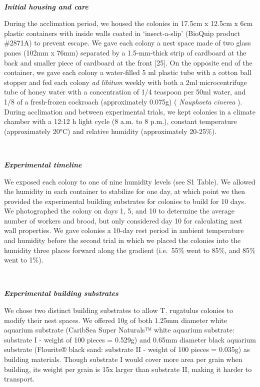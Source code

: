 \documentclass[3p]{elsarticle} %
\begin{document}
~

\textbf{\emph{Initial housing and care}}

During the acclimation period, we housed the colonies in 17.5cm x 12.5cm
x 6cm plastic containers with inside walls coated in `insect-a-slip'
(BioQuip product \#2871A) to prevent escape. We gave each colony a nest
space made of two glass panes (102mm x 76mm) separated by a 1.5-mm-thick
strip of cardboard at the back and smaller piece of cardboard at the
front {[}25{]}. On the opposite end of the container, we gave each
colony a water-filled 5 ml plastic tube with a cotton ball stopper and
fed each colony \emph{ad libitum} weekly with both a 2ml microcentrifuge
tube of honey water with a concentration of 1/4 teaspoon per 50ml water,
and 1/8 of a fresh-frozen cockroach (approximately 0.075g) (
\emph{Nauphoeta cinerea} ). During acclimation and between experimental
trials, we kept colonies in a climate chamber with a 12:12 h light cycle
(8 a.m. to 8 p.m.), constant temperature (approximately 20°C) and
relative humidity (approximately 20-25\%).

~

\textbf{\emph{Experimental timeline}}

We exposed each colony to one of nine humidity levels (see S1 Table). We
allowed the humidity in each container to stabilize for one day, at
which point we then provided the experimental building substrates for
colonies to build for 10 days. We photographed the colony on days 1, 5,
and 10 to determine the average number of workers and brood, but only
considered day 10 for calculating nest wall properties. We gave colonies
a 10-day rest period in ambient temperature and humidity before the
second trial in which we placed the colonies into the humidity three
places forward along the gradient (i.e.~55\% went to 85\%, and 85\% went
to 1\%).

~

\textbf{\emph{Experimental building substrates}}

We chose two distinct building substrates to allow T. rugatulus colonies
to modify their nest spaces. We offered 10g of both 1.25mm diameter
white aquarium substrate (CaribSea Super Naturals™ white aquarium
substrate: substrate I - weight of 100 pieces = 0.529g) and 0.65mm
diameter black aquarium substrate (Flourite® black sand: substrate II -
weight of 100 pieces = 0.035g) as building materials. Though substrate I
would cover more area per grain when building, its weight per grain is
15x larger than substrate II, making it harder to transport.
\end{document}
